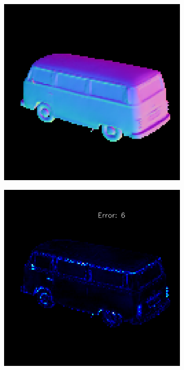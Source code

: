\begin{figure}
\begin{subfigure}[b]{0.24\linewidth}
	\end{subfigure}
	\begin{subfigure}[b]{0.24\linewidth}
		\includegraphics[width=\linewidth]{./Figures/gcnn_synthetic/fancy_eval_9_normal_GCNN-GCNN.png}
	\end{subfigure}
	\begin{subfigure}[b]{0.24\linewidth}
		\includegraphics[width=\linewidth]{./Figures/gcnn_synthetic/fancy_eval_9_error_GCNN-GCNN.png}
		

\end{subfigure}
\end{figure}

